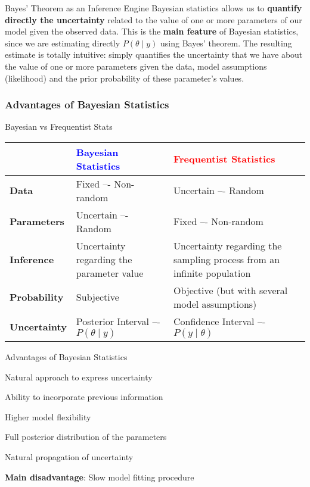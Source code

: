 \begin{frame}{Bayes' Theorem as an Inference Engine}
	Bayesian statistics allows us to \textbf{quantify directly the uncertainty} related to the value of one or more parameters of our model given the observed data.
	This is the \textbf{main feature} of Bayesian statistics, since we are estimating directly $P(\theta \mid y)$ using Bayes' theorem.
	The resulting estimate is totally intuitive: simply quantifies the uncertainty that we have about the value of one or more parameters given the data, model assumptions (likelihood) and the prior probability of these parameter's values.
\end{frame}

\subsubsection{Advantages of Bayesian Statistics}
\begin{frame}{Bayesian vs Frequentist Stats}
	\small
	\begin{tabular}
		{|l|p{}|p{}|}
		\toprule
		                     & \textcolor{blue}{\textbf{Bayesian Statistics}} & \textcolor{red}{\textbf{Frequentist Statistics}}                       \\ \midrule
		\textbf{Data}        & Fixed –- Non-random                            & Uncertain –- Random                                                    \\ \midrule
		\textbf{Parameters}  & Uncertain –- Random                            & Fixed –- Non-random                                                    \\ \midrule
		\textbf{Inference}   & Uncertainty regarding the parameter value      & Uncertainty regarding the sampling process from an infinite population \\ \midrule
		\textbf{Probability} & Subjective                                     & Objective (but with several model assumptions)                         \\ \midrule
		\textbf{Uncertainty} & Posterior Interval –- $P(\theta \mid y)$       & Confidence Interval –- $P(y \mid \theta)$                              \\
		\bottomrule
	\end{tabular}
\end{frame}

\begin{frame}{Advantages of Bayesian Statistics}
	\begin{vfilleditems}
		\item Natural approach to express uncertainty
		\item Ability to incorporate previous information
		\item Higher model flexibility
		\item Full posterior distribution of the parameters
		\item Natural propagation of uncertainty
	\end{vfilleditems}
	\small \textbf{Main disadvantage}: Slow model fitting procedure
\end{frame}


